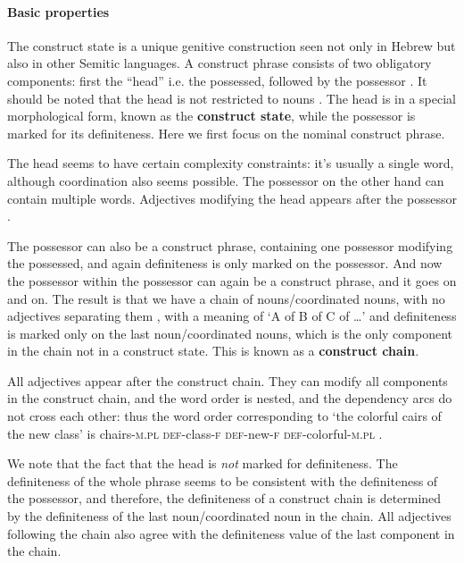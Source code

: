 \documentclass[a4paper, oneside, 12pt]{report}
\newcommand*{\citepage}[1]{p.~{#1}}
\newcommand*{\concept}[1]{\textbf{#1}}
\newcommand{\category}[1]{\textsc{#1}}
\newcommand{\translate}[1]{`#1'}
\begin{document}
\paragraph*{Basic properties}

The construct state is a unique genitive construction seen not only in Hebrew
but also in other Semitic languages.
A construct phrase consists of two obligatory components:
first the ``head'' i.e. the possessed,
followed by the possessor \citep[\citepage{26}]{glinert2004grammar}.
It should be noted that the head is not restricted to nouns
\citep[\citepage{25}]{glinert2004grammar}. 
The head is in a special morphological form,
known as the \concept{construct state},
while the possessor is marked for its definiteness.
Here we first focus on the nominal construct phrase.

The head seems to have certain complexity constraints:
it's usually a single word, although coordination also seems possible.
The possessor on the other hand can contain multiple words.
Adjectives modifying the head appears after the possessor
\citep[\citepage{25}]{glinert2004grammar}.

The possessor can also be a construct phrase,
containing one possessor modifying the possessed,
and again definiteness is only marked on the possessor.
And now the possessor within the possessor can again be a construct phrase,
and it goes on and on.
The result is that we have a chain of nouns/coordinated nouns,
with no adjectives separating them \citep{borer1999deconstructing},
with a meaning of \translate{A of B of C of \dots}
and definiteness is marked only on the last noun/coordinated nouns,
which is the only component in the chain not in a construct state.
This is known as a \concept{construct chain}.

All adjectives appear after the construct chain.
They can modify all components in the construct chain,
and the word order is nested,
and the dependency arcs do not cross each other:
thus the word order corresponding to \translate{the colorful cairs of the new class}
is chairs-\category{m.pl} \category{def}-class-\category{f} \category{def}-new-\category{f} \category{def}-colorful-\category{m.pl}
\citep{borer1999deconstructing}.

We note that the fact that the head is \emph{not} marked for definiteness.
The definiteness of the whole phrase seems to be consistent with the definiteness of the possessor,
and therefore, the definiteness of a construct chain 
is determined by the definiteness of the last noun/coordinated noun in the chain.
All adjectives following the chain also agree with the definiteness value 
of the last component in the chain.
\end{document}
